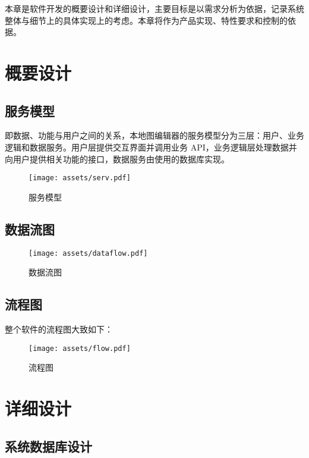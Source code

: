 
本章是软件开发的概要设计和详细设计，主要目标是以需求分析为依据，记录系统整体与细节上的具体实现上的考虑。本章将作为产品实现、特性要求和控制的依据。

\section{概要设计}

\subsection{服务模型}

即数据、功能与用户之间的关系，本地图编辑器的服务模型分为三层：用户、业务逻辑和数据服务。用户层提供交互界面并调用业务 API，业务逻辑层处理数据并向用户提供相关功能的接口，数据服务由使用的数据库实现。

\begin{figure}[H]
  \centering
  \texttt{[image: assets/serv.pdf]}
  \caption{服务模型}
  \label{fig:serv}
\end{figure}

\subsection{数据流图}

\begin{figure}[H]
  \centering
  \texttt{[image: assets/dataflow.pdf]}
  \caption{数据流图}
  \label{fig:dataflow}
\end{figure}

\subsection{流程图}

整个软件的流程图大致如下：

\begin{figure}[H]
  \centering
  \texttt{[image: assets/flow.pdf]}
  \caption{流程图}
  \label{fig:flow}
\end{figure}

\section{详细设计}

\subsection{系统数据库设计}

